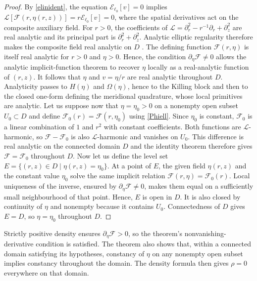 \documentclass[amsmath,amsfonts,amssymb,aps,pra,superscriptaddress,10pt]{revtex4-2}
\numberwithin{equation}{section}
\theoremstyle{plain}
\theoremstyle{definition}
\theoremstyle{remark}
\theoremstyle{definition}
\newcommand{\ellzero}{\ell_0}
\newcommand{\EE}{\mathcal E_{\ellzero}}
\begin{document}
\begin{proof}
By \eqref{elinident}, the equation $\EE[v]=0$ implies $\mathcal{L}[\mathcal{F}(r,\eta(r,z))]=r\EE[v]=0$, where the spatial derivatives act on the composite auxiliary field. For $r>0$, the coefficients of $\mathcal{L}=\partial_r^2-r^{-1}\partial_r+\partial_z^2$ are real analytic  and its principal part is $\partial_r^2+\partial_z^2$. Analytic elliptic regularity therefore makes the composite field real analytic on $D$ \cite{MorreyNirenberg1957CPAM}. The defining function $\mathcal{F}(r,\eta)$ is itself real analytic for $r>0$ and $\eta>0$. Hence, the condition $\partial_\eta\mathcal{F}\neq 0$ allows the analytic implicit-function theorem to recover $\eta$ locally as a real-analytic function of $(r,z)$. It follows that $\eta$ and $v=\eta/r$ are real analytic throughout $D$. Analyticity passes to $H(\eta)$ and $\Omega(\eta)$, hence to the Killing block and then to the closed one-form defining the meridional quadrature, whose local primitives are analytic. Let us suppose now that $\eta=\eta_0>0$ on a nonempty open subset $U_0\subset D$ and define $\mathcal{F}_0(r)=\mathcal{F}(r,\eta_0)$ using \eqref{Phiell}. Since $\eta_0$ is constant, $\mathcal{F}_0$ is a linear combination of $1$ and $r^2$ with constant coefficients. Both functions are $\mathcal{L}$-harmonic, so $\mathcal{F}-\mathcal{F}_0$ is also $\mathcal{L}$-harmonic and vanishes on $U_0$. This difference is real analytic on the connected domain $D$ and the identity theorem therefore gives $\mathcal{F}=\mathcal{F}_0$ throughout $D$. Now let us define the level set $E=\{(r,z)\in D\mid\eta(r,z)=\eta_0\}$. At a point of $E$, the given field $\eta(r,z)$ and the constant value $\eta_0$ solve the same implicit relation $\mathcal{F}(r,\eta)=\mathcal{F}_0(r)$. Local uniqueness of the inverse, ensured by $\partial_\eta\mathcal{F}\neq 0$, makes them equal on a sufficiently small neighbourhood of that point. Hence, $E$ is open in $D$. It is also closed by continuity of $\eta$ and nonempty because it contains $U_0$. Connectedness of $D$ gives $E=D$, so $\eta=\eta_0$ throughout $D$.
\end{proof}

Strictly positive density ensures $\partial_\eta\mathcal{F}>0$, so the theorem’s nonvanishing-derivative condition is satisfied. The theorem also shows that, within a connected domain satisfying its hypotheses, constancy of $\eta$ on any nonempty open subset implies constancy throughout the domain. The density formula then gives $\rho=0$ everywhere on that domain.
\end{document}
